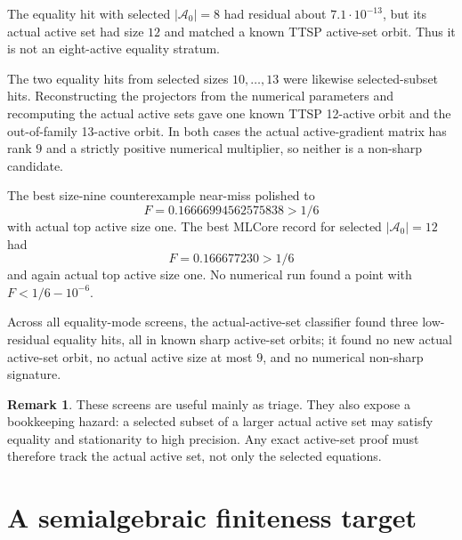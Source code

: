 \documentclass[11pt]{article}
\numberwithin{equation}{section}
\theoremstyle{definition}
\newtheorem{remark}[theorem]{Remark}
\newcommand{\cA}{\mathcal A}
\begin{document}
The equality hit with selected $|\cA_0|=8$ had residual about $7.1\cdot10^{-13}$,
but its actual active set had size $12$ and matched a known TTSP active-set
orbit.  Thus it is not an eight-active equality stratum.

The two equality hits from selected sizes $10,\ldots,13$ were likewise
selected-subset hits.  Reconstructing the projectors from the numerical
parameters and recomputing the actual active sets gave one known TTSP
12-active orbit and the out-of-family 13-active orbit.  In both cases the
actual active-gradient matrix has rank $9$ and a strictly positive numerical
multiplier, so neither is a non-sharp candidate.

The best size-nine counterexample near-miss polished to
\[
  F=0.16666994562575838>1/6
\]
with actual top active size one.  The best MLCore record for selected
$|\cA_0|=12$ had
\[
  F=0.166677230>1/6
\]
and again actual top active size one.  No numerical run found a point with
$F<1/6-10^{-6}$.

Across all equality-mode screens, the actual-active-set classifier found three
low-residual equality hits, all in known sharp active-set orbits; it found no new
actual active-set orbit, no actual active size at most $9$, and no numerical
non-sharp signature.

\begin{remark}
These screens are useful mainly as triage.  They also expose a bookkeeping
hazard: a selected subset of a larger actual active set may satisfy equality and
stationarity to high precision.  Any exact active-set proof must therefore track
the actual active set, not only the selected equations.
\end{remark}

\section{A semialgebraic finiteness target}
\end{document}
